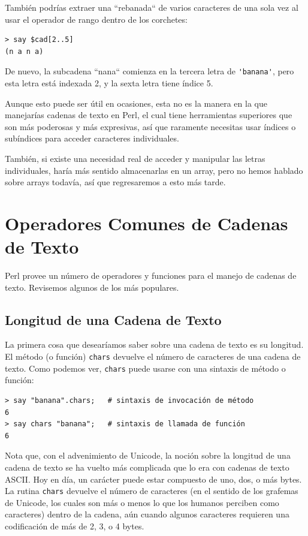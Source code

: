 También podrías extraer una ``rebanada`` de varios caracteres
de una sola vez al usar el operador de rango dentro de los 
corchetes:

\begin{verbatim}
> say $cad[2..5]
(n a n a)
\end{verbatim}
%
De nuevo, la subcadena ``nana`` comienza en la tercera letra
de \verb|'banana'|, pero esta letra está indexada 2, y la
sexta letra tiene índice 5.

Aunque esto puede ser útil en ocasiones, esta no es la manera
en la que manejarías cadenas de texto en Perl, el cual tiene
herramientas superiores que son más poderosas y más 
expresivas, así que raramente necesitas usar índices o 
subíndices para acceder caracteres individuales.

También, si existe una necesidad real de acceder y manipular
las letras individuales, haría más sentido almacenarlas en un 
array, pero no hemos hablado sobre arrays todavía, así que
regresaremos a esto más tarde.

\section{Operadores Comunes de Cadenas de Texto}

Perl provee un número de operadores y funciones para el 
manejo de cadenas de texto. Revisemos algunos de los más 
populares.

\subsection{Longitud de una Cadena de Texto}

La primera cosa que desearíamos saber sobre una cadena de texto 
es su longitud. El método (o función) {\tt chars} devuelve el número de
caracteres de una cadena de texto. Como podemos ver, {\tt chars} puede
usarse con una sintaxis de método o función:

\begin{verbatim}
> say "banana".chars;   # sintaxis de invocación de método
6
> say chars "banana";   # sintaxis de llamada de función
6
\end{verbatim}
%

Nota que, con el advenimiento de Unicode, la noción 
sobre la longitud de una cadena de texto se ha vuelto 
más complicada que lo era con cadenas de texto ASCII.
Hoy en día, un carácter puede estar compuesto de uno, dos, o 
más bytes. La rutina {\tt chars} devuelve el número de 
caracteres (en el sentido de los grafemas de Unicode, los cuales
son más o menos lo que los humanos perciben como caracteres) dentro
de la cadena, aún cuando algunos caracteres requieren una
codificación de más de 2, 3, o 4 bytes.

